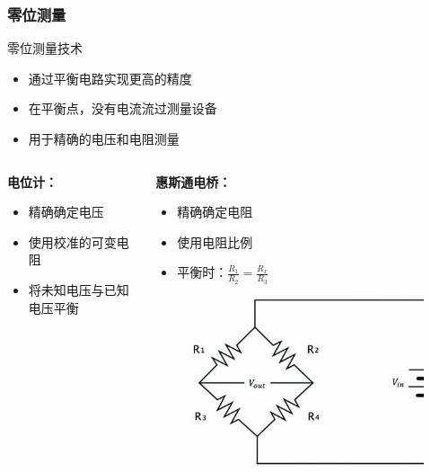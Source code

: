 \documentclass{beamer}
\begin{document}
\begin{frame}
    \frametitle{零位测量}
    \begin{block}{零位测量技术}
        \begin{itemize}
            \item 通过平衡电路实现更高的精度
            \item 在平衡点，没有电流流过测量设备
            \item 用于精确的电压和电阻测量
        \end{itemize}
    \end{block}
    \begin{columns}
        \begin{column}{0.5\textwidth}
            \textbf{电位计：}
            \begin{itemize}
                \item 精确确定电压
                \item 使用校准的可变电阻
                \item 将未知电压与已知电压平衡
            \end{itemize}
        \end{column}
        \begin{column}{0.5\textwidth}
            \textbf{惠斯通电桥：}
            \begin{itemize}
                \item 精确确定电阻
                \item 使用电阻比例
                \item 平衡时：$\frac{R_1}{R_2} = \frac{R_x}{R_3}$
            \end{itemize}
            \begin{figure}
                \centering
                \includegraphics[width=0.5\linewidth]{wheatstone.jpg}
            \end{figure}
        \end{column}
    \end{columns}
\end{frame}
\end{document}
